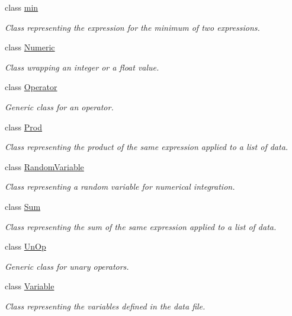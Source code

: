 \begin{DoxyCompactItemize}
class \hyperlink{classbio__expression_1_1min}{min}
\begin{DoxyCompactList}\small\item\em Class representing the expression for the minimum of two expressions. \end{DoxyCompactList}\item 
class \hyperlink{classbio__expression_1_1_numeric}{Numeric}
\begin{DoxyCompactList}\small\item\em Class wrapping an integer or a float value. \end{DoxyCompactList}\item 
class \hyperlink{classbio__expression_1_1_operator}{Operator}
\begin{DoxyCompactList}\small\item\em Generic class for an operator. \end{DoxyCompactList}\item 
class \hyperlink{classbio__expression_1_1_prod}{Prod}
\begin{DoxyCompactList}\small\item\em Class representing the product of the same expression applied to a list of data. \end{DoxyCompactList}\item 
class \hyperlink{classbio__expression_1_1_random_variable}{Random\+Variable}
\begin{DoxyCompactList}\small\item\em Class representing a random variable for numerical integration. \end{DoxyCompactList}\item 
class \hyperlink{classbio__expression_1_1_sum}{Sum}
\begin{DoxyCompactList}\small\item\em Class representing the sum of the same expression applied to a list of data. \end{DoxyCompactList}\item 
class \hyperlink{classbio__expression_1_1_un_op}{Un\+Op}
\begin{DoxyCompactList}\small\item\em Generic class for unary operators. \end{DoxyCompactList}\item 
class \hyperlink{classbio__expression_1_1_variable}{Variable}
\begin{DoxyCompactList}\small\item\em Class representing the variables defined in the data file. \end{DoxyCompactList}\end{DoxyCompactItemize}
